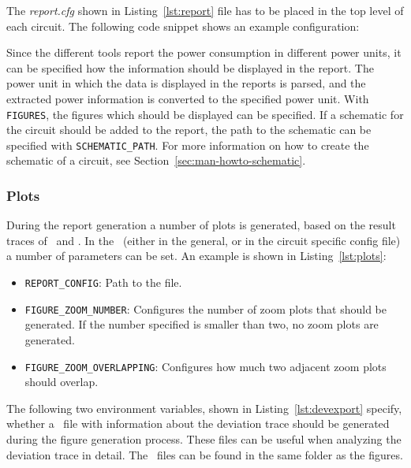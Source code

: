 The \emph{report.cfg} shown in Listing~\ref{lst:report} file has to be placed 
in the top level of each circuit. The following code snippet shows an example 
configuration:


Since the different tools report the power consumption in different
power units, it can be specified how the information should be displayed
in the report. The power unit in which the data is displayed in the
reports is parsed, and the extracted power information is converted to the
specified power unit. With \lstinline|FIGURES|, the figures which should be
displayed can be specified. If a schematic for the circuit should be
added to the report, the path to the schematic can be specified with
\lstinline|SCHEMATIC_PATH|. For more information on how to create the
schematic of a circuit, see Section~\ref{sec:man-howto-schematic}.

\subsubsection{Plots}\label{sec:man-report-plots}

During the report generation a number of plots is generated, based on
the result traces of \spice\ and \modelsim. In the \configcfg\ (either in
the general, or in the circuit specific config file) a number of
parameters can be set. An example is shown in Listing~\ref{lst:plots}:


\begin{itemize}
\item
  \lstinline|REPORT_CONFIG|: Path to the  file.
\item
  \lstinline|FIGURE_ZOOM_NUMBER|: Configures the number of zoom plots that 
  should be generated. If the number specified is smaller than two, no zoom
  plots are generated.
\item
  \lstinline|FIGURE_ZOOM_OVERLAPPING|: Configures how much two adjacent zoom 
  plots should overlap.
\end{itemize}

The following two environment variables, shown in Listing~\ref{lst:devexport} 
specify, whether a \csvfile\ file with information about the deviation trace 
should be generated during the figure generation process. These files can be 
useful when analyzing the deviation trace in detail. The \csvfile\ files can be 
found in the same folder as the figures.

